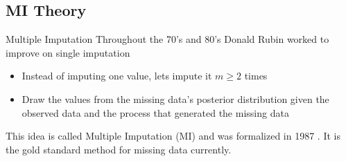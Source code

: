 \subsection{MI Theory}
\begin{frame}{Multiple Imputation}
Throughout the 70's and 80's Donald Rubin worked to improve on single imputation
\begin{itemize}
 \item Instead of imputing one value, lets impute it $m\geq 2$ times
 \item Draw the values from the missing data's posterior distribution given the observed
 data and the process that generated the missing data
\end{itemize}
This idea is called Multiple Imputation (MI) and was formalized in 1987 \cite{Rubin1987}. It is the gold standard method
for missing data currently.


\end{frame}


